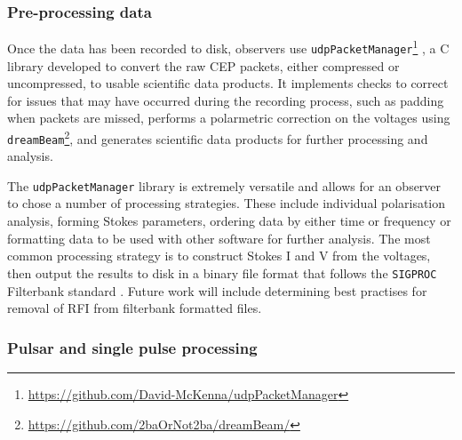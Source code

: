\subsubsection{Pre-processing data}
\label{sec:baseproc}%
Once the data has been recorded to disk, observers use \texttt{udpPacketManager}\footnote{\hyperref[udpPacketManager]{https://github.com/David-McKenna/udpPacketManager}} \citep{McKenna2020}, a C library developed to convert the raw CEP packets, either compressed or uncompressed, to usable scientific data products. It implements checks to correct for issues that may have occurred during the recording process, such as padding when packets are missed, performs a polarmetric correction on the voltages using \texttt{dreamBeam}\footnote{\hyperref[dreamBeam]{https://github.com/2baOrNot2ba/dreamBeam/}}, and generates scientific data products for further processing and analysis.

The \texttt{udpPacketManager} library is extremely versatile and allows for an observer to chose a number of processing strategies. These include individual polarisation analysis, forming Stokes parameters, ordering data by either time or frequency or formatting data to be used with other software for further analysis. The most common processing strategy is to construct Stokes I and V from the voltages, then output the results to disk in a binary file format that follows the \texttt{SIGPROC} Filterbank standard \citep{Lorimer2011}. Future work will include determining best practises for removal of RFI from filterbank formatted files.


\subsubsection{Pulsar and single pulse processing}
\label{sec:pulsarproc}


